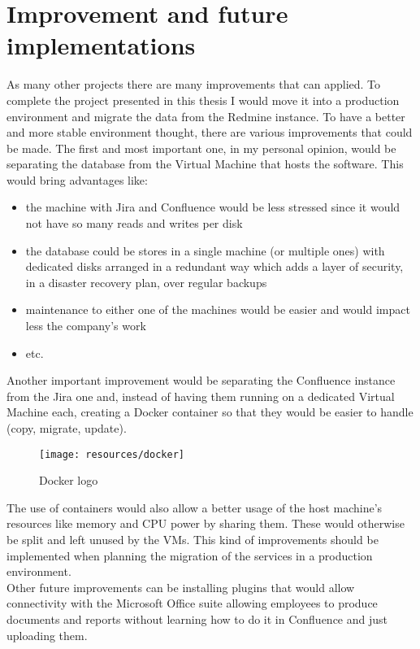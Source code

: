 \section{Improvement and future implementations}
	As many other projects there are many improvements that can applied.
	To complete the project presented in this thesis I would move it into a production environment and migrate the data from the Redmine instance.
	To have a better and more stable environment thought, there are various improvements that could be made.
	The first and most important one, in my personal opinion, would be separating the database from the Virtual Machine that hosts the software.
	This would bring advantages like: 
	\begin{itemize}
		\item the machine with Jira and Confluence would be less stressed since it would not have so many reads and writes per disk
		\item the database could be stores in a single machine (or multiple ones) with dedicated disks arranged in a redundant way which adds a layer of security, in a disaster recovery plan, over regular backups
		\item maintenance to either one of the machines would be easier and would impact less the company's work
		\item etc.
	\end{itemize}
	Another important improvement would be separating the Confluence instance from the Jira one and, instead of having them running on a dedicated Virtual Machine each, creating a Docker \cite{dock} \gls{container} so that they would be easier to handle (copy, migrate, update).
	\begin{figure}[H]
		\centering
		\texttt{[image: resources/docker]}\\
		\caption{Docker logo}
	\end{figure}
	The use of containers would also allow a better usage of the host machine's resources like memory and CPU power by sharing them.
	These would otherwise be split and left unused by the VMs.
	This kind of improvements should be implemented when planning the migration of the services in a production environment.\\
	Other future improvements can be installing plugins that would allow connectivity with the Microsoft Office suite allowing employees to produce documents and reports without learning how to do it in Confluence and just uploading them.

